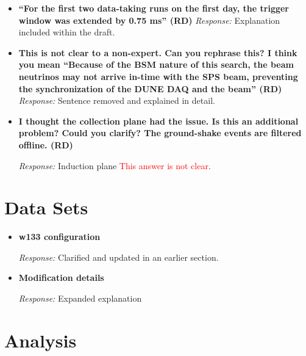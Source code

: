 \documentclass[11pt]{article}
\begin{document}
\begin{itemize}[leftmargin=*]
\item \textbf{“For the first two data-taking runs on the first day, the trigger window was
extended by 0.75 ms” (RD)}
\textit{Response:} Explanation included within the draft.

\item \textbf{This is not clear to a non-expert. Can you rephrase this? I think you mean “Because of the BSM nature of this search, the beam neutrinos may not arrive in-time
with the SPS beam, preventing the synchronization of the DUNE DAQ and the beam” (RD)}
\textit{Response:} Sentence removed and explained in detail.

\item \textbf{ I thought the collection plane had the issue. Is this an additional problem? Could you clarify?
 The ground-shake events are filtered offline. (RD)}

\textit{Response:} Induction plane \textcolor{red}{This answer is not clear}.
\end{itemize}

\section*{Data Sets}

\begin{itemize}[leftmargin=*]

\item \textbf{w133 configuration}

\textit{Response:} Clarified and updated in an earlier section.


\item \textbf{Modification details}

\textit{Response:} Expanded explanation

\end{itemize}

\section*{Analysis}
\end{document}
